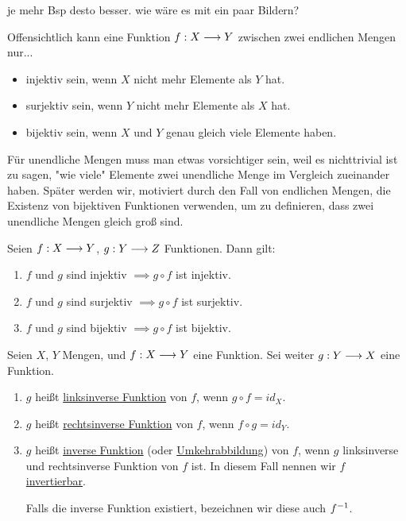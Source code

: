 \begin{example}
    je mehr Bsp desto besser. wie wäre es mit ein paar Bildern?
\end{example}

\begin{remark}
    Offensichtlich kann eine Funktion $f: X \longrightarrow Y$ zwischen zwei endlichen Mengen nur...
    \begin{itemize}
        \item injektiv sein, wenn $X$ nicht mehr Elemente als $Y$ hat.
        \item surjektiv sein, wenn $Y$ nicht mehr Elemente als $X$ hat.
        \item bijektiv sein, wenn $X$ und $Y$ genau gleich viele Elemente haben.
    \end{itemize}
    Für unendliche Mengen muss man etwas vorsichtiger sein, weil es nichttrivial ist zu sagen, "wie viele" Elemente zwei unendliche Menge im Vergleich zueinander haben. Später werden wir, motiviert durch den Fall von endlichen Mengen, die Existenz von bijektiven Funktionen verwenden, um zu definieren, dass zwei unendliche Mengen gleich groß sind.
\end{remark}

\begin{lemma}[lemma]
    Seien $f: X \longrightarrow Y$, $g: Y \longrightarrow Z$ Funktionen. Dann gilt:
    \begin{enumerate}
        \item $f$ und $g$ sind injektiv $\implies g \circ f$ ist injektiv.
        \item $f$ und $g$ sind surjektiv $\implies g \circ f$ ist surjektiv.
        \item $f$ und $g$ sind bijektiv $\implies g \circ f$ ist bijektiv.
    \end{enumerate}
\end{lemma}

\begin{definition}[Umkehrfunktion]
    Seien $X$, $Y$ Mengen, und $f: X \longrightarrow Y$ eine Funktion. Sei weiter $g: Y \longrightarrow X$ eine Funktion.
    \begin{enumerate}
        \item $g$ heißt \underline{linksinverse Funktion} von $f$, wenn $g \circ f = id_X$.
        \item $g$ heißt \underline{rechtsinverse Funktion} von $f$, wenn $f \circ g = id_Y$.
        \item $g$ heißt \underline{inverse Funktion} (oder \underline{Umkehrabbildung}) von $f$, wenn $g$ linksinverse und rechtsinverse Funktion von $f$ ist. In diesem Fall nennen wir $f$ \underline{invertierbar}.
        
        Falls die inverse Funktion existiert, bezeichnen wir diese auch $f^{-1}$.
    \end{enumerate}
\end{definition}

